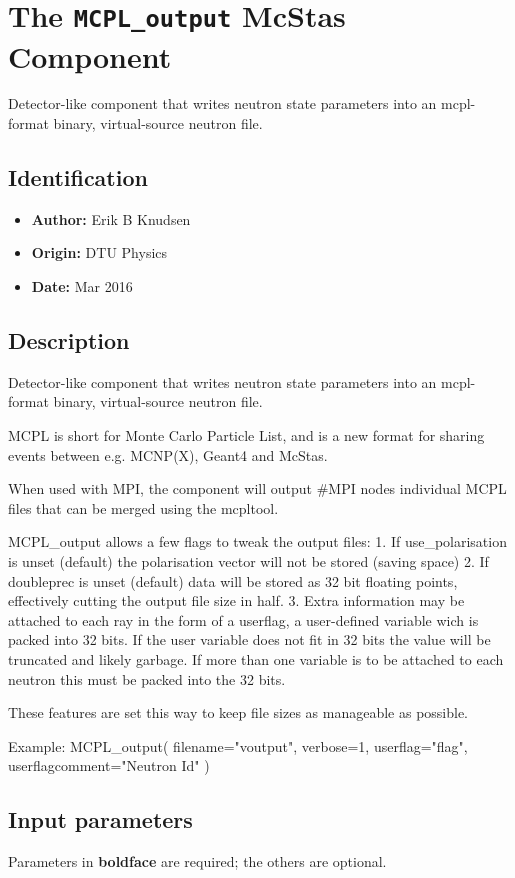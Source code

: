 \section{The \texttt{MCPL\_output} McStas Component}
Detector-like component that writes neutron state parameters into an mcpl-format
binary, virtual-source neutron file.

\subsection*{Identification}
\begin{itemize}
  \item \textbf{Author:} Erik B Knudsen
  \item \textbf{Origin:} DTU Physics
  \item \textbf{Date:} Mar 2016
\end{itemize}

\subsection*{Description}
Detector-like component that writes neutron state parameters into an mcpl-format binary, virtual-source neutron file.

MCPL is short for Monte Carlo Particle List, and is a new format for sharing events between e.g. MCNP(X), Geant4 and McStas.

When used with MPI, the component will output \#MPI nodes individual MCPL files that can be merged using the mcpltool.

MCPL\_output allows a few flags to tweak the output files: 1. If use\_polarisation is unset (default) the polarisation vector will not be stored (saving space) 2. If doubleprec is unset (default) data will be stored as 32 bit floating points, effectively cutting the output file size in half. 3. Extra information may be attached to each ray in the form of a userflag, a user-defined variable wich is packed into 32 bits. If the user variable does not fit in 32 bits the value will be truncated and likely garbage. If more than one variable is to be attached to each neutron this must be packed into the 32 bits.

These features are set this way to keep file sizes as manageable as possible.

Example: MCPL\_output( filename="voutput", verbose=1, userflag="flag", userflagcomment="Neutron Id" )

\subsection*{Input parameters}
Parameters in \textbf{boldface} are required; the others are optional.

